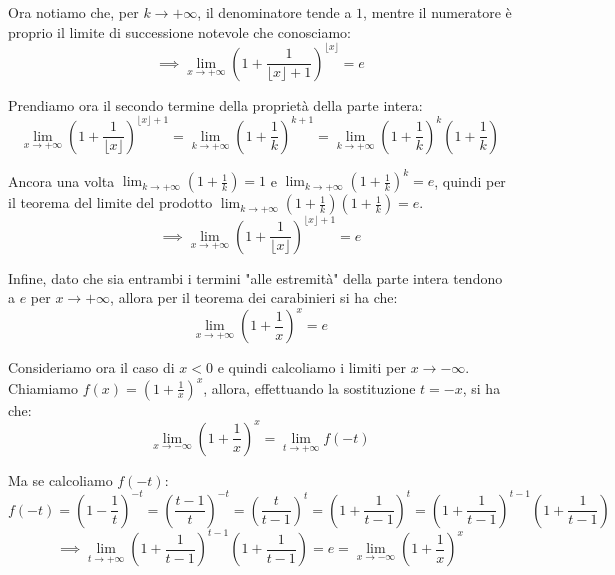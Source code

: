 \documentclass{article}
\begin{document}
\noindent Ora notiamo che, per $k \to +\infty$, il denominatore tende a $1$, mentre il numeratore è proprio il limite di successione notevole che conosciamo:
\begin{equation*}
    \implies \lim_{x \to +\infty} \left(1 + \frac{1}{\lfloor x \rfloor + 1}\right)^{\lfloor x \rfloor} = e
\end{equation*}

\noindent Prendiamo ora il secondo termine della proprietà della parte intera:
\begin{equation*}
    \lim_{x \to +\infty} \left(1 + \frac{1}{\lfloor x \rfloor}\right)^{\lfloor x \rfloor + 1} = \lim_{k \to +\infty} \left(1 + \frac{1}{k}\right)^{k + 1} = \lim_{k \to +\infty} \left(1 + \frac{1}{k}\right)^k \left(1 + \frac{1}{k}\right)
\end{equation*}

\noindent Ancora una volta $\lim_{k \to +\infty} \left(1 + \frac{1}{k}\right) = 1$ e $\lim_{k \to +\infty} \left(1 + \frac{1}{k}\right)^k = e$, quindi per il teorema del limite del prodotto $\lim_{k \to +\infty} \left(1 + \frac{1}{k}\right) \left(1 + \frac{1}{k}\right) = e$.
\begin{equation*}
    \implies \lim_{x \to +\infty} \left(1 + \frac{1}{\lfloor x \rfloor}\right)^{\lfloor x \rfloor + 1} = e
\end{equation*}

\noindent Infine, dato che sia entrambi i termini "alle estremità" della parte intera tendono a $e$ per $x \to +\infty$, allora per il teorema dei carabinieri si ha che:
\begin{equation*}
    \lim_{x \to +\infty} \left(1 + \frac{1}{x}\right)^x = e
\end{equation*}

\noindent Consideriamo ora il caso di $x < 0$ e quindi calcoliamo i limiti per $x \to -\infty$. Chiamiamo $f(x) = (1 + \frac{1}{x})^x$, allora, effettuando la sostituzione $t = -x$, si ha che:
\begin{equation*}
    \lim_{x \to -\infty} \left(1 + \frac{1}{x}\right)^x = \lim_{t \to +\infty} f(-t)
\end{equation*}

\noindent Ma se calcoliamo $f(-t)$:
\begin{equation*}
    f(-t) = \left(1 - \frac{1}{t}\right)^{-t} = \left(\frac{t - 1}{t}\right)^{-t} = \left(\frac{t}{t - 1}\right)^t = \left(1 + \frac{1}{t - 1}\right)^t = \left(1 + \frac{1}{t - 1}\right)^{t-1}\left(1 + \frac{1}{t - 1}\right)
\end{equation*}
\begin{equation*}
    \implies \lim_{t \to +\infty} \left(1 + \frac{1}{t - 1}\right)^{t-1}\left(1 + \frac{1}{t - 1}\right) = e = \lim_{x \to -\infty} \left(1 + \frac{1}{x}\right)^x
\end{equation*}
\end{document}
